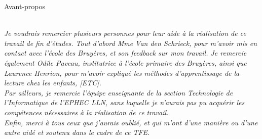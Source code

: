 \begin{center}
\begin{minipage}{0.8\textwidth}
\begin{center}
\large Avant-propos
\end{center}

\textit{\\Je voudrais remercier plusieurs personnes pour leur aide à la réalisation de ce travail de fin d'études. Tout d'abord Mme Van den Schrieck, pour m'avoir mis en contact avec l'école des Bruyères, et son feedback sur mon travail. Je remercie également Odile Paveau, institutrice à l'école primaire des Bruyères, ainsi que Laurence Henrion, pour m'avoir expliqué les méthodes d'apprentissage de la lecture chez les enfants, [ETC].\\
Par ailleurs, je remercie l'équipe enseignante de la section Technologie de l'Informatique de l'EPHEC LLN, sans laquelle je n'aurais pas pu acquérir les compétences nécessaires à la réalisation de ce travail.\\
Enfin, merci à tous ceux que j'aurais oublié, et qui m'ont d'une manière ou d'une autre aidé et soutenu dans le cadre de ce TFE. }
\end{minipage}
\end{center}
